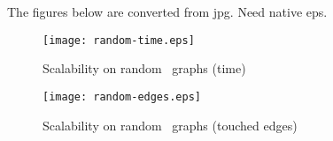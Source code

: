 \XXX The figures below are converted from jpg. Need native eps.

\begin{figure*}
\begin{minipage}[b]{0.5\linewidth}
\flushleft
\texttt{[image: random-time.eps]}
\caption{Scalability on random~\citep{BarabasiA99} graphs (time)}
\label{fig:random:time}
\end{minipage}%
\begin{minipage}[b]{0.5\linewidth}
\centering
\texttt{[image: random-edges.eps]}
\caption{Scalability on random~\citep{BarabasiA99} graphs (touched edges)}
\label{fig:random:edges}
\end{minipage}
\end{figure*}


